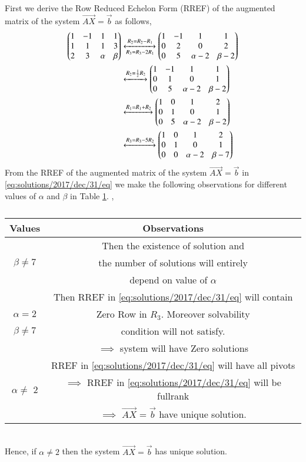 First we derive the Row Reduced Echelon Form (RREF) of the augmented matrix of the system $\vec{AX} = \vec{b}$ as follows,
\begin{align}
\begin{pmatrix}1&-1&1&1\\1&1&1&3\\2&3&\alpha&\beta\end{pmatrix}&\xleftrightarrow[R_3=R_3-2R_1]{R_2=R_2-R_1}\begin{pmatrix}1&-1&1&1\\0&2&0&2\\0&5&\alpha-2&\beta-2\end{pmatrix}\\
&\xleftrightarrow{R_2=\frac{1}{2}R_2}\begin{pmatrix}1&-1&1&1\\0&1&0&1\\0&5&\alpha-2&\beta-2\end{pmatrix}\\
&\xleftrightarrow{R_1=R_1+R_2}\begin{pmatrix}1&0&1&2\\0&1&0&1\\0&5&\alpha-2&\beta-2\end{pmatrix}\\
&\xleftrightarrow{R_3=R_3-5R_2}\begin{pmatrix}1&0&1&2\\0&1&0&1\\0&0&\alpha-2&\beta-7\end{pmatrix}\label{eq:solutions/2017/dec/31/eq}
\end{align}
From the RREF of the augmented matrix of the system $\vec{AX} = \vec{b}$ in \eqref{eq:solutions/2017/dec/31/eq} we make the following observations for different values of $\alpha$ and $\beta$ in Table \ref{eq:solutions/2017/dec/31/table}.
, 
\begin{table}[ht!]
\begin{center}
\begin{tabular}{|c|c|}
\hline
Values & Observations\\
\hline
& Then the existence of solution and \\
$\beta \ne 7$ & the number of solutions will entirely \\
& depend on  value of $\alpha$\\
\hline
& Then RREF in \eqref{eq:solutions/2017/dec/31/eq} will contain \\
$\alpha = 2$ & Zero Row in $R_3$. Moreover solvability\\
$\beta \ne 7$ & condition will not satisfy. \\
& $\implies$ system will have Zero solutions\\
\hline
& RREF in \eqref{eq:solutions/2017/dec/31/eq} will have all pivots\\
$\alpha \ne$ 2 & $\implies$ RREF in \eqref{eq:solutions/2017/dec/31/eq} will be fullrank\\
& $\implies$ $\vec{AX}=\vec{b}$ have unique solution.\\
\hline
\end{tabular}
\end{center}
\caption{}
\label{eq:solutions/2017/dec/31/table}
\end{table}\\
Hence, if $\alpha \ne 2$ then the system $\vec{AX} = \vec{b}$ has unique solution.
